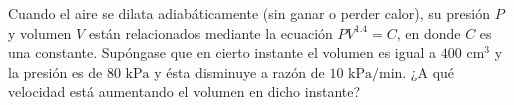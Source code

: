\item Cuando el aire se dilata adiabáticamente (sin ganar o perder calor), su presión $P$ y volumen $V$ están relacionados mediante la ecuación $PV^{1.4} = C$, en donde $C$ es una constante. Supóngase que en cierto instante el volumen es igual a $400 \text{ cm}^3$ y la presión es de $80 \text{ kPa}$ y ésta disminuye a razón de $10 \text{ kPa/min}$. ¿A qué velocidad está aumentando el volumen en dicho instante?
